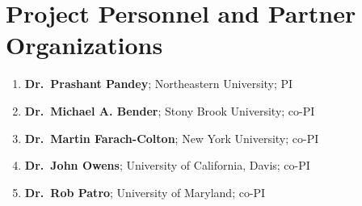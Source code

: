 
\section*{Project Personnel and Partner Organizations}
\vspace{0.1in}
\noindent
\begin{enumerate}
\item \textbf{Dr.\ Prashant Pandey}; Northeastern University; PI
\item \textbf{Dr.\ Michael A. Bender}; Stony Brook University; co-PI
\item \textbf{Dr.\ Martin Farach-Colton}; New York University; co-PI
\item \textbf{Dr.\ John Owens}; University of California, Davis; co-PI
\item \textbf{Dr.\ Rob Patro}; University of Maryland; co-PI
\end{enumerate}
